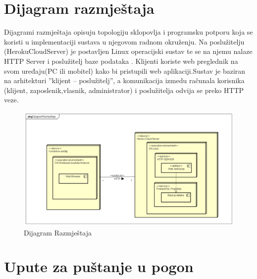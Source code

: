 \section{Dijagram razmještaja}
	

	
	\text Dijagrami razmještaja opisuju topologiju sklopovlja i programsku potporu koja se koristi u implementaciji sustava u njegovom radnom okruženju. Na poslužitelju
	(HerokuCloudServer) je postavljen Linux operacijski sustav te se na njemu nalaze HTTP Server i poslužitelj baze podataka . Klijenti koriste web preglednik na svom uređaju(PC ili mobitel) kako bi pristupili web aplikaciji.Sustav je baziran na arhitekturi ”klijent – poslužitelj”, a komunikacija izmedu računala korisnika (klijent, zaposlenik,vlasnik, administrator) i poslužitelja odvija se preko HTTP veze.  

		\begin{figure}[H]
			\includegraphics[scale=0.5]{slike/Dijagram Razmjestaja.png} %
			\centering
			\caption { Dijagram Razmještaja}
			\label{fig:5.1}
			\end{figure}

\newpage


\section{Upute za puštanje u pogon}

